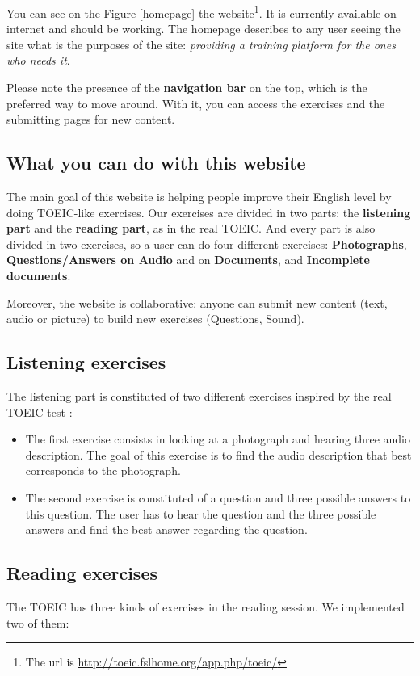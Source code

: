 \documentclass[12pt,a4paper]{report}
\begin{document}
You can see on the Figure \ref{homepage} the website\footnote{The url is
\url{http://toeic.fslhome.org/app.php/toeic/}}. It is currently available on
internet and should be working. The homepage describes to any user seeing the site what is the purposes of the site: \textit{providing a training platform for the ones who needs it}.

Please note the presence of the \textbf{navigation bar} on the top, which is the preferred way to move around. With it, you can access the exercises and the submitting pages for new content.


\subsection{What you can do with this website}

The main goal of this website is helping people improve their
English level by doing TOEIC-like exercises. Our exercises are
divided in two parts: the \textbf{listening part} and the
\textbf{reading part}, as in the real TOEIC. And every part
is also divided in two exercises, so a user can do four different
exercises: \textbf{Photographs}, \textbf{Questions/Answers on Audio} and
on \textbf{Documents}, and \textbf{Incomplete documents}.

Moreover, the website is collaborative: anyone can submit new content (text, audio or picture) to build new exercises (Questions, Sound).

\subsection{Listening exercises}

The listening part is constituted of two different exercises inspired by the real TOEIC test :

\begin{itemize}
\item The first exercise consists in looking at a photograph and hearing three audio description. The goal of this exercise is to find the audio description that best corresponds to the photograph.

\item The second exercise is constituted of a question and three possible answers to this question. The user has to hear the question and the three possible answers and find the best answer regarding the question.
\end{itemize}

\subsection{Reading exercises}
The TOEIC has three kinds of exercises in the reading session. We implemented
two of them:
\end{document}
